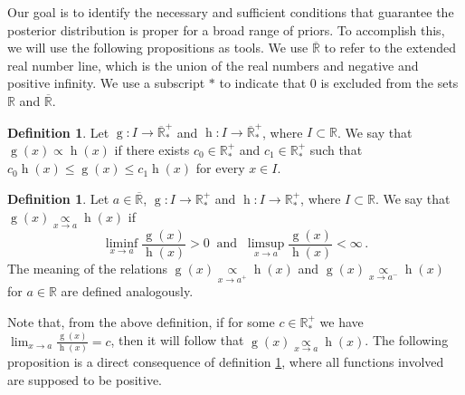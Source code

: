 \documentclass[12pt]{article} %
\newcommand{\f}{\operatorname}
\theoremstyle{plain}%
\theoremstyle{definition}
\newtheorem{definition}[theorem]{Definition}
\theoremstyle{remark}
\begin{document}

Our goal is to identify the necessary and sufficient conditions that guarantee the posterior distribution is proper for a broad range of priors. To accomplish this, we will use the following propositions as tools. We use $\overline{\mathbb{R}}$ to refer to the extended real number line, which is the union of the real numbers and negative and positive infinity. We use a subscript $*$ to indicate that $0$ is excluded from the sets $\mathbb{R}$ and $\overline{\mathbb{R}}$.

\begin{definition}\label{definition0} Let $\f{g}:I\to\overline{\mathbb{R}}_*^+$ and $\f{h}:I\to\overline{\mathbb{R}}_*^+$, where $I\subset\mathbb{R}$. We say that $\f{g}(x)\propto \f{h}(x)$ if there exists $c_0\in \mathbb{R}^+_*$ and $c_1\in \mathbb{R}^+_*$ such that $c_0\f{h}(x) \leq \f{g}(x) \leq c_1\f{h}(x)$ for every $x\in I$.
\end{definition}

\begin{definition}\label{definition1}
Let $a\in \mathbb{\overline{R}}$, $\f{g}:I\to\mathbb{R^+_*}$ and $\f{h}:I\to\mathbb{R^+_*}$, where $I\subset\mathbb{R}$. We say that $\f{g}(x)\underset{x\to a}{\propto} \f{h}(x)$ if
\begin{equation*}
\liminf_{x\to a} \frac{\f{g}(x)}{\f{h}(x)} > 0\ \mbox{ and }\ \limsup_{x\to a} \frac{\f{g}(x)}{\f{h}(x)} < \infty  \,.
\end{equation*}
The meaning of the relations $\f{g}(x)\underset{x\to a^+}{\propto} \f{h}(x)$ and $\f{g}(x)\underset{x\to a^-}{\propto} \f{h}(x)$ for $a\in \mathbb{R}$ are defined analogously.
\end{definition}

Note that, from the above definition, if for some $c\in \mathbb{R}^+_*$ we have $\lim_{x\to a} \frac{\f{g}(x)}{\f{h}(x)} = c$, then it will follow that $\f{g}(x)\underset{x\to a}{\propto} \f{h}(x)$. The following proposition is a direct consequence of definition \ref{definition1}, where all functions involved are supposed to be positive.
\end{document}
